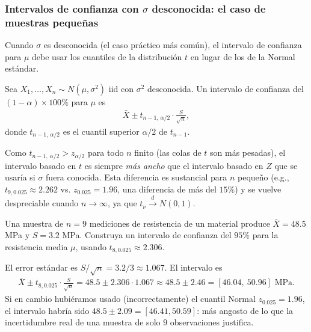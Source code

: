 \subsubsection{Intervalos de confianza con $\sigma$ desconocida: el caso de muestras
peque\~nas}

Cuando $\sigma$ es desconocida (el caso pr\'actico m\'as com\'un), el intervalo de
confianza para $\mu$ debe usar los cuantiles de la distribuci\'on $t$ en lugar de los
de la Normal est\'andar.

\begin{teorema}
 \label{eq:5.4.1}
Sea $X_1, \ldots, X_n \sim N(\mu, \sigma^2)$ iid con $\sigma^2$ desconocida. Un
intervalo de confianza del $(1-\alpha)\times 100\%$ para $\mu$ es
\begin{align}
 \bar{X} \pm t_{n-1,\,\alpha/2} \cdot \frac{S}{\sqrt{n}},
\end{align}
donde $t_{n-1,\,\alpha/2}$ es el cuantil superior $\alpha/2$ de $t_{n-1}$.
\end{teorema}

\begin{observacion}
Como $t_{n-1,\,\alpha/2} > z_{\alpha/2}$ para todo $n$ finito (las colas de $t$ son
m\'as pesadas), el intervalo basado en $t$ es siempre \emph{m\'as ancho} que el
intervalo basado en $Z$ que se usar\'ia si $\sigma$ fuera conocida. Esta diferencia es
sustancial para $n$ peque\~no (e.g., $t_{9,0.025}\approx 2.262$ vs.
$z_{0.025}=1.96$, una diferencia de m\'as del $15\%$) y se vuelve despreciable
cuando $n \to \infty$, ya que $t_\nu \xrightarrow{d} N(0,1)$.
\end{observacion}

\begin{ejemplo}
 \label{exmp:5.4.1}
Una muestra de $n=9$ mediciones de resistencia de un material produce
$\bar{X}=48.5$ MPa y $S=3.2$ MPa. Construya un intervalo de confianza del $95\%$
para la resistencia media $\mu$, usando $t_{8,0.025}\approx 2.306$.
\end{ejemplo}

\begin{solucion}
El error est\'andar es $S/\sqrt{n} = 3.2/3 \approx 1.067$. El intervalo es
\begin{align}
 \bar{X} \pm t_{8,0.025}\cdot\frac{S}{\sqrt{n}} = 48.5 \pm 2.306\cdot 1.067
 \approx 48.5 \pm 2.46 = [46.04,\ 50.96] \text{ MPa}.
\end{align}
Si en cambio hubi\'eramos usado (incorrectamente) el cuantil Normal
$z_{0.025}=1.96$, el intervalo habr\'ia sido $48.5 \pm 2.09 = [46.41, 50.59]$: m\'as
angosto de lo que la incertidumbre real de una muestra de solo $9$ observaciones
justifica.
\end{solucion}


